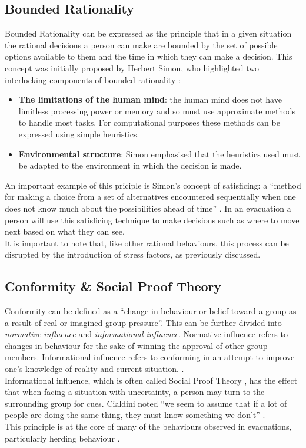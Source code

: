\subsection{Bounded Rationality}
\label{Res:subsec:nonadaptive}
Bounded Rationality can be expressed as the principle that in a given situation the rational decisions a person can make are bounded by the set of possible options available to them and the time in which they can make a decision. This concept was initially proposed by Herbert Simon, who highlighted two interlocking components of bounded rationality \cite{BoundedRationalityDefinition}:
\begin{itemize}
  \item{\textbf{The limitations of the human mind}: the human mind does not have limitless processing power or memory and so must use approximate methods to handle most tasks. For computational purposes these methods can be expressed using simple heuristics.}
  \item{\textbf{Environmental structure}: Simon emphasised that the heuristics used must be adapted to the environment in which the decision is made.}
\end{itemize}
An important example of this priciple is Simon's concept of satisficing: a ``method for making a choice from a set of alternatives encountered sequentially when one does not know much about the possibilities ahead of time'' \cite{BoundedRationalityDefinition}. In an evacuation a person will use this satisficing technique to make decisions such as where to move next based on what they can see.\\
It is important to note that, like other rational behaviours, this process can be disrupted by the introduction of stress factors, as previously discussed.

\subsection{Conformity \& Social Proof Theory}
\label{Res:subsec:socialProof}
Conformity can be defined as a ``change in behaviour or belief toward a group as a result of real or imagined group pressure''. This can be further divided into \emph{normative influence} and \emph{informational influence}. Normative influence refers to changes in behaviour for the sake of winning the approval of other group members. Informational influence refers to conforming in an attempt to improve one's knowledge of reality and current situation. \cite{HandbookOfPsychology5}.\\
Informational influence, which is often called Social Proof Theory \cite{SocialProofWiki},  has the effect that when facing a situation with uncertainty, a person may turn to the surrounding group for cues. Cialdini noted ``we seem to assume that if a lot of people are doing the same thing, they must know something we don't'' \cite{PanMASSEgressThesis}.\\
This principle is at the core of many of the behaviours observed in evacuations, particularly herding behaviour \cite{PanMASSEgressThesis,MultiAgentFramework}.

